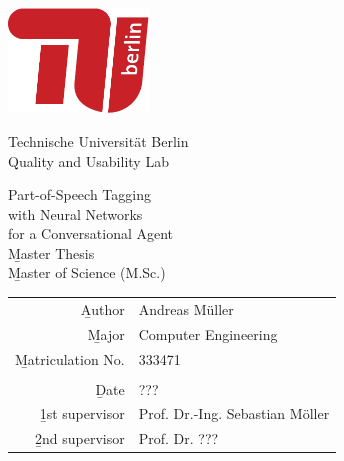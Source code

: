 
\pagestyle{empty}

\clearscrheadings\clearscrplain
\begin{center}
\includegraphics[width=0.28\textwidth]{images/logo_tu_berlin}
\vspace{8mm}

{\huge Technische Universität Berlin}\\
\vspace{3mm}
{\large Quality and Usability Lab}\\
\vspace{11mm}

{\Huge Part-of-Speech Tagging\\[-2mm] with Neural Networks\\[-2mm] for a Conversational Agent\\}
\vspace{20mm}
{\Huge \b{Master Thesis}}\\
{\b{Master of Science (M.Sc.)}}\\
\vspace{24mm}
\begin{tabular}{rl}
  \b{Author} & Andreas Müller\\
  \b{Major} & Computer Engineering\\
  \b{Matriculation No.} & 333471\\
   & \\
  \b{Date} & ??? \\
  \b{1st supervisor} & Prof. Dr.-Ing. Sebastian Möller \\
  \b{2nd supervisor} & Prof. Dr. ??? \\
\end{tabular}

\end{center}
\clearpage

\pagestyle{useheadings} %

